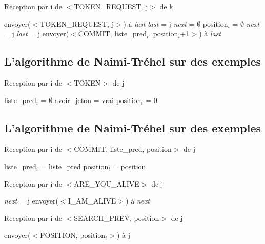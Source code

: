 \documentclass[a4paper,12pt]{article}
\newcommand{\nt}{Naimi-Tréhel }
\newcommand{\last}{\textit{last} }
\newcommand{\next}{\textit{next} }
\begin{document}
\begin{algorithm}[t]
\caption{Reception par i de $<$TOKEN\_REQUEST, j$>$ de k}
\label{algo_naimi_trehel_amelioration_recpt_TK}
\begin{algorithmic}[1]

\IF {\last$_{i}$ $\ne$ i}
  \STATE envoyer($<$TOKEN\_REQUEST, j$>$) à \last 
  \STATE \last = j
  \STATE \next = $\emptyset$
  \STATE position$_{i}$ = $\emptyset$
\ELSE
\STATE \next = j
\STATE \last = j
\STATE envoyer($<$COMMIT, liste\_pred$_{i}$, position$_{i}$+1$>$) à \last
\ENDIF
\end{algorithmic}
\end{algorithm}\subsection{L'algorithme de \nt sur des exemples}





\begin{algorithm}[t]
\caption{Reception par i de $<$TOKEN$>$ de j}
\label{algo_naimi_trehel_amelioration_recpt_T}
\begin{algorithmic}[1]
\STATE liste\_pred$_{i}$ = $\emptyset$
\STATE avoir\_jeton = vrai
\STATE position$_{i}$ = 0
\end{algorithmic}
\end{algorithm}\subsection{L'algorithme de \nt sur des exemples}


\begin{algorithm}[t]
\caption{Reception par i de $<$COMMIT, liste\_pred, position$>$ de j}
\label{algo_naimi_trehel_amelioration_recpt_C}
\begin{algorithmic}[1]
\STATE liste\_pred$_{i}$ = liste\_pred
\STATE position$_{i}$ = position
\end{algorithmic}
\end{algorithm}

\begin{algorithm}[t]
\caption{Reception par i de $<$ARE\_YOU\_ALIVE$>$ de j}
\label{algo_naimi_trehel_amelioration_recpt_AYA}
\begin{algorithmic}[1]
\STATE \next = j
\STATE envoyer($<$I\_AM\_ALIVE$>$) à \next
\end{algorithmic}
\end{algorithm}


\begin{algorithm}[t]
\caption{Reception par i de $<$SEARCH\_PREV, position$>$ de j}
\label{algo_naimi_trehel_amelioration_recpt_AYA}
\begin{algorithmic}[1]
  \STATE envoyer($<$POSITION, position$_{i}>$) à j
\ENDIF 
\end{algorithmic}
\end{algorithm}
\end{document}
